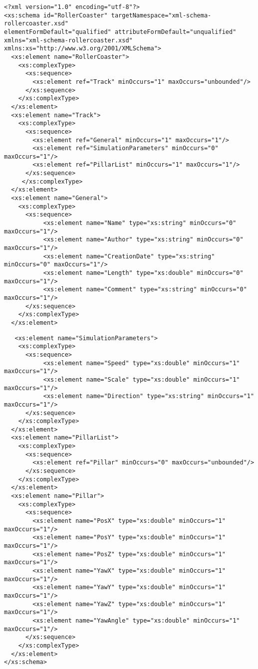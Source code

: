\begin{verbatim}
<?xml version="1.0" encoding="utf-8"?>
<xs:schema id="RollerCoaster" targetNamespace="xml-schema-rollercoaster.xsd" 
elementFormDefault="qualified" attributeFormDefault="unqualified" 
xmlns="xml-schema-rollercoaster.xsd" xmlns:xs="http://www.w3.org/2001/XMLSchema">
  <xs:element name="RollerCoaster">
    <xs:complexType>
      <xs:sequence>
        <xs:element ref="Track" minOccurs="1" maxOccurs="unbounded"/>
      </xs:sequence>
    </xs:complexType>
  </xs:element>
  <xs:element name="Track">
    <xs:complexType>
      <xs:sequence>
        <xs:element ref="General" minOccurs="1" maxOccurs="1"/>
        <xs:element ref="SimulationParameters" minOccurs="0" maxOccurs="1"/>
        <xs:element ref="PillarList" minOccurs="1" maxOccurs="1"/>
      </xs:sequence>
     </xs:complexType>
  </xs:element>
  <xs:element name="General">
    <xs:complexType>
      <xs:sequence>
           <xs:element name="Name" type="xs:string" minOccurs="0" maxOccurs="1"/>
           <xs:element name="Author" type="xs:string" minOccurs="0" maxOccurs="1"/>
           <xs:element name="CreationDate" type="xs:string" minOccurs="0" maxOccurs="1"/>
           <xs:element name="Length" type="xs:double" minOccurs="0" maxOccurs="1"/>
           <xs:element name="Comment" type="xs:string" minOccurs="0" maxOccurs="1"/>
      </xs:sequence>
    </xs:complexType>
  </xs:element>
\end{verbatim}

\newpage

\begin{verbatim}
   <xs:element name="SimulationParameters">
    <xs:complexType>
      <xs:sequence>
           <xs:element name="Speed" type="xs:double" minOccurs="1" maxOccurs="1"/>
           <xs:element name="Scale" type="xs:double" minOccurs="1" maxOccurs="1"/>
           <xs:element name="Direction" type="xs:string" minOccurs="1" maxOccurs="1"/>
      </xs:sequence>
    </xs:complexType>
  </xs:element>
  <xs:element name="PillarList">
    <xs:complexType>
      <xs:sequence>
        <xs:element ref="Pillar" minOccurs="0" maxOccurs="unbounded"/>
      </xs:sequence>
    </xs:complexType>
  </xs:element>
  <xs:element name="Pillar">
    <xs:complexType>
      <xs:sequence>
        <xs:element name="PosX" type="xs:double" minOccurs="1" maxOccurs="1"/>
        <xs:element name="PosY" type="xs:double" minOccurs="1" maxOccurs="1"/>
        <xs:element name="PosZ" type="xs:double" minOccurs="1" maxOccurs="1"/>
        <xs:element name="YawX" type="xs:double" minOccurs="1" maxOccurs="1"/>
        <xs:element name="YawY" type="xs:double" minOccurs="1" maxOccurs="1"/>
        <xs:element name="YawZ" type="xs:double" minOccurs="1" maxOccurs="1"/>
        <xs:element name="YawAngle" type="xs:double" minOccurs="1" maxOccurs="1"/>
      </xs:sequence>
    </xs:complexType>
  </xs:element>
</xs:schema>
\end{verbatim}

